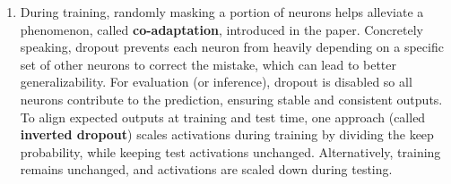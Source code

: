\begin{parts}
\begin{subparts}
{\begin{enumerate}[label=\roman*.]
                \begin{equation}
                \gamma (1 - p_{\text{drop}}) \bh = \bh \Rightarrow \gamma = \frac{1}{1 - p_{\text{drop}}}
                \end{equation}
                
                \item
                During training, randomly masking a portion of neurons helps alleviate a phenomenon, called \textbf{co-adaptation}, introduced in the paper. Concretely speaking, dropout prevents each neuron from heavily depending on a specific set of other neurons to correct the mistake, which can lead to better generalizability.\newline
                For evaluation (or inference), dropout is disabled so all neurons contribute to the prediction, ensuring stable and consistent outputs. To align expected outputs at training and test time, one approach (called \textbf{inverted dropout}) scales activations during training by dividing the keep probability, while keeping test activations unchanged. Alternatively, training remains unchanged, and activations are scaled down during testing.
                
                \end{enumerate}
            }
         
        \end{subparts}


\end{parts}
